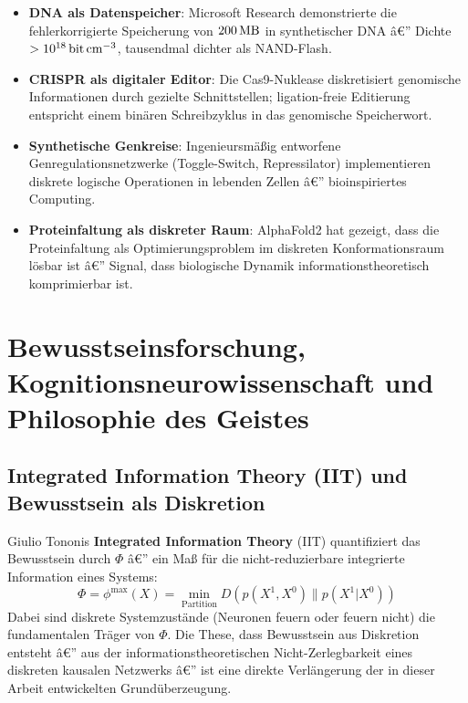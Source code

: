 ﻿\documentclass[12pt,a4paper,titlepage]{report}
\begin{document}
\begin{itemize}[leftmargin=2em]
    \item \textbf{DNA als Datenspeicher}: Microsoft Research demonstrierte
        die fehlerkorrigierte Speicherung von $\SI{200}{\mega\byte}$ in synthetischer
        DNA â€” Dichte $>\SI{e18}{\bit\per\centi\meter\cubed}$, tausendmal
        dichter als NAND-Flash.
    \item \textbf{CRISPR als digitaler Editor}: Die Cas9-Nuklease diskretisiert
        genomische Informationen durch gezielte Schnittstellen; ligation-freie
        Editierung entspricht einem binären Schreibzyklus in das genomische Speicherwort.
    \item \textbf{Synthetische Genkreise}: Ingenieursmäßig entworfene
        Genregulationsnetzwerke (Toggle-Switch, Repressilator) implementieren
        diskrete logische Operationen in lebenden Zellen â€” bioinspiriertes Computing.
    \item \textbf{Proteinfaltung als diskreter Raum}: AlphaFold2 hat gezeigt,
        dass die Proteinfaltung als Optimierungsproblem im diskreten Konformationsraum
        lösbar ist â€” Signal, dass biologische Dynamik informationstheoretisch
        komprimierbar ist.
\end{itemize}

\section{Bewusstseinsforschung, Kognitionsneurowissenschaft und Philosophie des
Geistes}

\subsection{Integrated Information Theory (IIT) und Bewusstsein als Diskretion}

Giulio Tononis \textbf{Integrated Information Theory} (IIT) quantifiziert das
Bewusstsein durch $\Phi$ â€” ein Maß für die nicht-reduzierbare integrierte Information
eines Systems:
\[
    \Phi = \phi^{\max}(X) = \min_{\text{Partition}} D(p(X^1,X^0) \| p(X^1|X^0))
\]
Dabei sind diskrete Systemzustände (Neuronen feuern oder feuern nicht) die
fundamentalen Träger von $\Phi$. Die These, dass Bewusstsein aus Diskretion entsteht
â€” aus der informationstheoretischen Nicht-Zerlegbarkeit eines diskreten kausalen
Netzwerks â€” ist eine direkte Verlängerung der in dieser Arbeit entwickelten
Grundüberzeugung.
\end{document}
